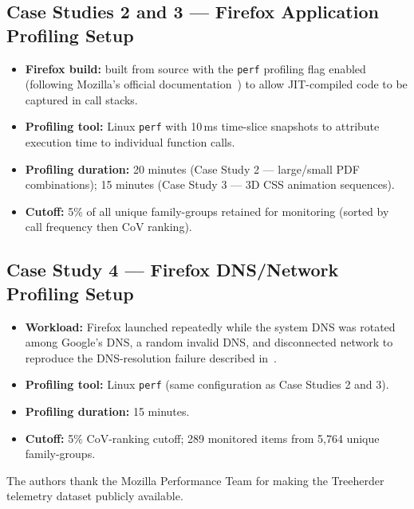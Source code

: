 \documentclass[pdflatex,sn-nature]{sn-jnl}
\theoremstyle{thmstyleone}%
\begin{document}
\subsection*{Case Studies 2 and 3 --- Firefox Application Profiling Setup}
\begin{itemize}
  \item \textbf{Firefox build:} built from source with the \texttt{perf}
    profiling flag enabled (following Mozilla's official documentation~\cite{firefoxdocumentation})
    to allow JIT-compiled code to be captured in call stacks.
  \item \textbf{Profiling tool:} Linux \texttt{perf} with 10\,ms time-slice
    snapshots to attribute execution time to individual function calls.
  \item \textbf{Profiling duration:} 20 minutes (Case Study 2 --- large/small
    PDF combinations); 15 minutes (Case Study 3 --- 3D CSS animation sequences).
  \item \textbf{Cutoff:} 5\% of all unique family-groups retained for monitoring
    (sorted by call frequency then CoV ranking).
\end{itemize}

\subsection*{Case Study 4 --- Firefox DNS/Network Profiling Setup}
\begin{itemize}
  \item \textbf{Workload:} Firefox launched repeatedly while the system DNS
    was rotated among Google's DNS, a random invalid DNS, and disconnected
    network to reproduce the DNS-resolution failure described in~\cite{cook-2022}.
  \item \textbf{Profiling tool:} Linux \texttt{perf} (same configuration as
    Case Studies 2 and 3).
  \item \textbf{Profiling duration:} 15 minutes.
  \item \textbf{Cutoff:} 5\% CoV-ranking cutoff; 289 monitored items from
    5,764 unique family-groups.
\end{itemize}

\backmatter

The authors thank the Mozilla Performance Team for making the Treeherder
telemetry dataset publicly available.
\end{document}
